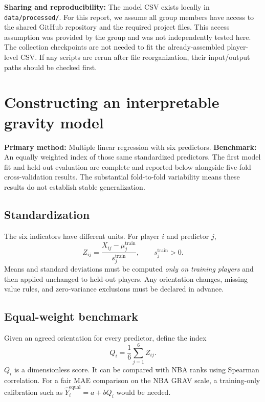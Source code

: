 \documentclass[11pt]{article}
\begin{document}
\textbf{Sharing and reproducibility:} The model CSV exists locally in
\texttt{data/processed/}. For this report, we assume all group members have
access to the shared GitHub repository and the required project files.
This access assumption was provided by the group and was not independently
tested here. The collection checkpoints are not needed to fit the
already-assembled player-level CSV. If any scripts are rerun after file
reorganization, their input/output paths should be checked first.

\section{Constructing an interpretable gravity model}
\textbf{Primary method:} Multiple linear regression with six predictors.
\textbf{Benchmark:} An equally weighted index of those same standardized predictors.
The first model fit and held-out evaluation are complete and reported
below alongside five-fold cross-validation results. The substantial
fold-to-fold variability means these results do not establish stable
generalization.

\subsection{Standardization}
The six indicators have different units. For player $i$ and predictor $j$,
\begin{equation}
Z_{ij}=\frac{X_{ij}-\mu_j^{\mathrm{train}}}{s_j^{\mathrm{train}}},
\qquad s_j^{\mathrm{train}}>0.
\label{eq:zscore}
\end{equation}
Means and standard deviations must be computed \emph{only on training players}
and then applied unchanged to held-out players. Any orientation changes, missing
value rules, and zero-variance exclusions must be declared in advance.

\subsection{Equal-weight benchmark}
Given an agreed orientation for every predictor, define the index
\begin{equation}
Q_i=\frac{1}{6}\sum_{j=1}^{6}Z_{ij}.
\label{eq:equal}
\end{equation}
$Q_i$ is a dimensionless score. It can be compared with NBA ranks using Spearman
correlation. For a fair MAE comparison on the NBA GRAV scale, a training-only
calibration such as $\widehat Y_i^{\mathrm{equal}}=a+bQ_i$ would be needed.
\end{document}
